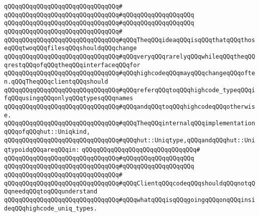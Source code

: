 \verb|qQQqqQQqqQQqqQQqqQQqqQQqqQQqqQQq#|\newline
\verb|qQQqqQQqqQQqqQQqqQQqqQQqqQQqqQQq#qQQqqQQqqQQqqQQqqQQq|\newline
\verb|qQQqqQQqqQQqqQQqqQQqqQQqqQQqqQQq#qQQqqQQqqQQqqQQqqQQq|\newline
\verb|qQQqqQQqqQQqqQQqqQQqqQQqqQQqqQQq#|\newline
\verb|qQQqqQQqqQQqqQQqqQQqqQQqqQQqqQQq#qQQqTheqQQqideaqQQqisqQQqthatqQQqthoseqQQqtwoqQQqfilesqQQqshouldqQQqchange|\newline
\verb|qQQqqQQqqQQqqQQqqQQqqQQqqQQqqQQq#qQQqveryqQQqrarelyqQQqwhileqQQqtheqQQqrestqQQqofqQQqtheqQQqinterfaceqQQqfor|\newline
\verb|qQQqqQQqqQQqqQQqqQQqqQQqqQQqqQQq#qQQqhighcodeqQQqmayqQQqchangeqQQqoften.qQQqTheqQQqclientqQQqshould|\newline
\verb|qQQqqQQqqQQqqQQqqQQqqQQqqQQqqQQq#qQQqreferqQQqtoqQQqhighcode_typeqQQqifqQQqusingqQQqonlyqQQqtypesqQQqnames|\newline
\verb|qQQqqQQqqQQqqQQqqQQqqQQqqQQqqQQq#qQQqandqQQqtoqQQqhighcodeqQQqotherwise.|\newline
\newline
\verb|qQQqqQQqqQQqqQQqqQQqqQQqqQQqqQQq#qQQqTheqQQqinternalqQQqimplementationqQQqofqQQqhut::Uniqkind,|\newline
\verb|qQQqqQQqqQQqqQQqqQQqqQQqqQQqqQQq#qQQqhut::Uniqtype,qQQqandqQQqhut::UniqtypoidqQQqareqQQqin:|\newline
\verb|qQQqqQQqqQQqqQQqqQQqqQQqqQQqqQQq#|\newline
\verb|qQQqqQQqqQQqqQQqqQQqqQQqqQQqqQQq#qQQqqQQqqQQqqQQqqQQq|\newline
\verb|qQQqqQQqqQQqqQQqqQQqqQQqqQQqqQQq#qQQqqQQqqQQqqQQqqQQq|\newline
\verb|qQQqqQQqqQQqqQQqqQQqqQQqqQQqqQQq#|\newline
\verb|qQQqqQQqqQQqqQQqqQQqqQQqqQQqqQQq#qQQqClientqQQqcodeqQQqshouldqQQqnotqQQqneedqQQqtoqQQqunderstand|\newline
\verb|qQQqqQQqqQQqqQQqqQQqqQQqqQQqqQQq#qQQqwhatqQQqisqQQqgoingqQQqonqQQqinsideqQQqhighcode_uniq_types.|\newline
